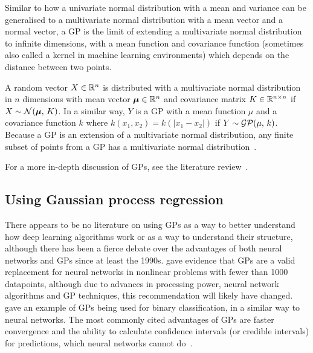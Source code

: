 Similar to how a univariate normal distribution with a mean and variance can be generalised to a multivariate normal distribution with a mean vector and a normal vector, a \ac{GP} is the limit of extending a multivariate normal distribution to infinite dimensions, with a mean function and covariance function (sometimes also called a kernel in machine learning environments) which depends on the distance between two points.

A random vector \(X \in \mathbb{R}{}^n\) is distributed with a multivariate normal distribution in \(n\) dimensions with mean vector \(\bm{\mu} \in \mathbb{R}{}^n\) and covariance matrix \(K \in \mathbb{R}^{n \times n}\) if \(X \sim \mathcal{N}(\bm{\mu},\, K)\).
In a similar way, \(Y\) is a \ac{GP} with a mean function \(\mu\) and a covariance function \(k\) where \(k(x_1, x_2) = k(\left|x_1 - x_2\right|)\) if \(Y \sim \mathcal{GP}(\mu,\, k)\).
Because a \ac{GP} is an extension of a multivariate normal distribution, any finite subset of points from a \ac{GP} has a multivariate normal distribution~\autocite[515]{williams1996}.

For a more in-depth discussion of \acp{GP}, see the literature review~\autocite{smit2018}.

\subsection{Using Gaussian process regression}

There appears to be no literature on using \acp{GP} as a way to better understand how deep learning algorithms work or as a way to understand their structure, although there has been a fierce debate over the advantages of both neural networks and \acp{GP} since at least the 1990s.
\textcite[65--66]{rasmussen1997} gave evidence that \acp{GP} are a valid replacement for neural networks in nonlinear problems with fewer than 1000 datapoints, although due to advances in processing power, neural network algorithms and \ac{GP} techniques, this recommendation will likely have changed.
\textcite[25]{mackay1997} gave an example of \acp{GP} being used for binary classification, in a similar way to neural networks.
The most commonly cited advantages of \acp{GP} are faster convergence and the ability to calculate confidence intervals (or credible intervals) for predictions, which neural networks cannot do~\autocite{herbrich2003}.

